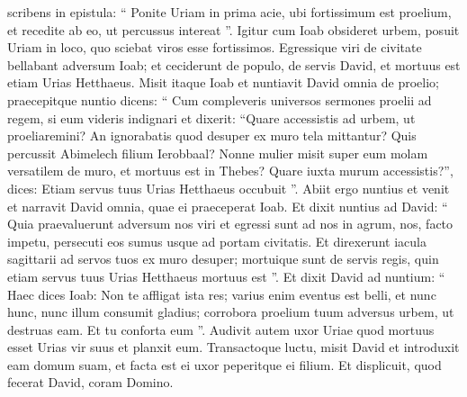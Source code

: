 \begin{biblechapter}
\begin{biblechapter}
\begin{biblechapter}
\begin{biblechapter}
\begin{biblechapter}
\begin{biblechapter}
\begin{biblechapter}
\begin{biblechapter}
\begin{biblechapter}
\begin{biblechapter}
\begin{biblechapter}
\verse scribens in epistula: “ Ponite Uriam in prima acie, ubi fortissimum est proelium, et recedite ab eo, ut percussus intereat ”. 
\verse Igitur cum Ioab obsideret urbem, posuit Uriam in loco, quo sciebat viros esse fortissimos. 
 \verse Egressique viri de civitate bellabant adversum Ioab; et ceciderunt de populo, de servis David, et mortuus est etiam Urias Hetthaeus.
 \verse Misit itaque Ioab et nuntiavit David omnia de proelio; 
\verse praecepitque nuntio dicens: “ Cum compleveris universos sermones proelii ad regem, 
\verse si eum videris indignari et dixerit: “Quare accessistis ad urbem, ut proeliaremini? An ignorabatis quod desuper ex muro tela mittantur? 
\verse Quis percussit Abimelech filium Ierobbaal? Nonne mulier misit super eum molam versatilem de muro, et mortuus est in Thebes? Quare iuxta murum accessistis?”, dices: Etiam servus tuus Urias Hetthaeus occubuit ”.
 \verse Abiit ergo nuntius et venit et narravit David omnia, quae ei praeceperat Ioab. 
\verse Et dixit nuntius ad David: “ Quia praevaluerunt adversum nos viri et egressi sunt ad nos in agrum, nos, facto impetu, persecuti eos sumus usque ad portam civitatis. 
\verse Et direxerunt iacula sagittarii ad servos tuos ex muro desuper; mortuique sunt de servis regis, quin etiam servus tuus Urias Hetthaeus mortuus est ”. 
\verse Et dixit David ad nuntium: “ Haec dices Ioab: Non te affligat ista res; varius enim eventus est belli, et nunc hunc, nunc illum consumit gladius; corrobora proelium tuum adversus urbem, ut destruas eam. Et tu conforta eum ”.
 \verse Audivit autem uxor Uriae quod mortuus esset Urias vir suus et planxit eum. 
 \verse Transactoque luctu, misit David et introduxit eam domum suam, et facta est ei uxor peperitque ei filium. Et displicuit, quod fecerat David, coram Domino.
 

\end{biblechapter}
\end{biblechapter}
\end{biblechapter}
\end{biblechapter}
\end{biblechapter}
\end{biblechapter}
\end{biblechapter}
\end{biblechapter}
\end{biblechapter}
\end{biblechapter}
\end{biblechapter}
